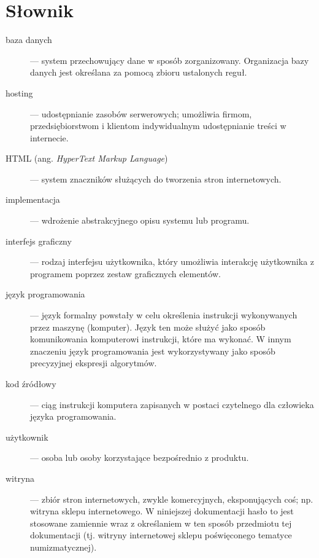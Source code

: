\documentclass 	[11pt, a4paper, leqno]	{article}					%
\begin{document}
\section{Słownik}
\begin{description}

\item[baza danych] --- system przechowujący dane w sposób zorganizowany. Organizacja bazy danych jest określana za pomocą zbioru ustalonych reguł. 

\item[hosting] --- udostępnianie zasobów serwerowych; umożliwia firmom, przedsiębiorstwom i klientom indywidualnym udostępnianie treści w internecie.

\item[HTML (\textnormal{ang.} \textit{HyperText Markup Language})] ---  system znaczników służących do tworzenia stron internetowych.

\item[implementacja] --- wdrożenie abstrakcyjnego opisu systemu lub programu.

\item[interfejs graficzny] --- rodzaj interfejsu użytkownika, który umożliwia interakcję użytkownika z programem poprzez zestaw graficznych elementów.

\item[język programowania] --- język formalny powstały w celu określenia instrukcji wykonywanych przez maszynę (komputer). 
Język ten może służyć jako sposób komunikowania komputerowi instrukcji, które ma wykonać. W innym znaczeniu język programowania jest wykorzystywany jako sposób precyzyjnej ekspresji algorytmów.

\item[kod źródłowy] --- ciąg instrukcji komputera zapisanych w postaci czytelnego dla człowieka języka programowania. 

\item[użytkownik] --- osoba lub osoby korzystające bezpośrednio z produktu.

\item[witryna] --- zbiór stron internetowych, zwykle komercyjnych, eksponujących coś; np. witryna sklepu internetowego. W niniejszej dokumentacji hasło to jest stosowane zamiennie wraz z określaniem w ten sposób przedmiotu tej dokumentacji (tj. witryny internetowej sklepu poświęconego tematyce numizmatycznej).


\end{description}
\end{document}
